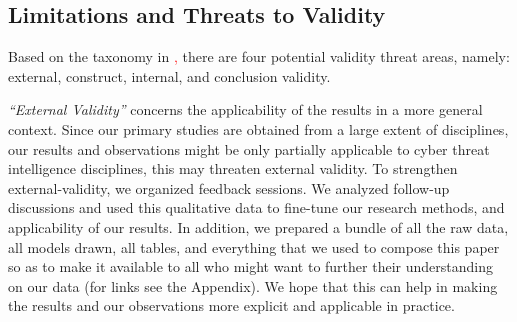 \subsection{Limitations and Threats to Validity}

Based on the taxonomy in \textcolor{red}{\cite{wohlin}, }there are four potential validity threat areas, namely: external, construct, internal, and conclusion validity. 

\emph{ ``External Validity''} concerns the applicability of the results in a more general context. Since our primary studies are obtained from a large extent of disciplines, our results and observations might be only partially applicable to cyber threat intelligence disciplines, this may threaten external validity. To strengthen external-validity, we organized feedback sessions. We analyzed follow-up discussions and used this qualitative data to fine-tune our research methods, and applicability of our results. In addition, we prepared a bundle of all the raw data, all models drawn, all tables, and everything that we used to compose this paper so as to make it available to all who might want to further their understanding on our data (for links see the Appendix). We hope that this can help in making the results and our observations more explicit and applicable in practice.


